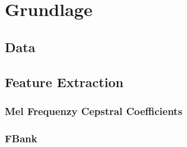 %
% 
%

\chapter{Grundlage}

\section{Data}



\section{Feature Extraction}

\subsection{Mel Frequenzy Cepstral Coefficients}

\subsection{FBank}




%
%